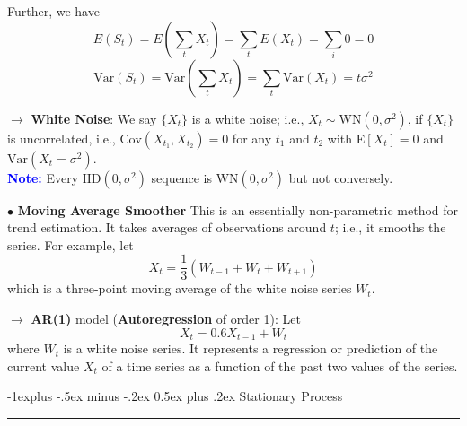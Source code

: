 \documentclass[letterpaper, 10.5pt,landscape]{article}
\makeatletter
\renewcommand{\subsection}{\@startsection{subsection}{2}{0mm}%
                                {-1explus -.5ex minus -.2ex}%
                                {0.5ex plus .2ex}%
                                {\normalfont\normalsize\bfseries}}
\makeatother
\begin{document}
\begin{multicols*}{3}
\vspace{-3pt}
Further, we have
\vspace{-3pt}
\[E(S_{t}) =  E\left( \sum_{t} X_{t} \right) = \sum_{t} E(X_{t}) = \sum_{i} 0 = 0\]
\vspace{-3pt}
\[\text{Var}(S_{t}) = \text{Var}\left(\sum_{t} X_{t} \right) = \sum_{t} \text{Var}(X_{t}) = t\sigma^{2} \]


$\rightarrow$ \textbf{White Noise}: We say $\{X_{t} \}$ is a white noise; i.e., $X_{t} \sim \text{WN}(0, \sigma^{2})$, if $\{X_{t} \}$ is uncorrelated, i.e., $\text{Cov}\left(X_{t_{1}}, X_{t_{2}}\right) = 0 $ for any $t_{1}$ and $t_{2}$ with E$[X_{t}] = 0$ and $\text{Var}(X_{t} = \sigma^{2})$. \\

\vspace{3pt}
\textcolor{blue}{\textbf{Note:}} Every $\text{IID}(0, \sigma^{2})$ sequence is $\text{WN}(0, \sigma^{2})$ but not conversely. \\


\vspace{5pt}

$\bullet$ \textbf{Moving Average Smoother} This is an essentially non-parametric method for trend estimation. It takes averages of observations around $t$; i.e., it smooths the series. For example, let 
\vspace{-3pt}
\[X_{t} = \frac{1}{3}\left(W_{t-1} + W_{t} + W_{t+1} \right)\]
which is a three-point moving average of the white noise series $W_{t}$. 

\vspace{2pt}
$\rightarrow$ \textbf{AR(1)} model (\textbf{Autoregression} of order 1): Let
\vspace{-3pt}
\[X_{t} = 0.6X_{t-1} + W_{t} \]
where $W_{t}$ is a white noise series. It represents a regression or prediction of the current value $X_{t}$ of a time series as a function of the past two values of the series.




\subsection{Stationary Process} {\color{teal}\hrule height 0.5pt} \smallskip









\end{multicols*}
\end{document}
